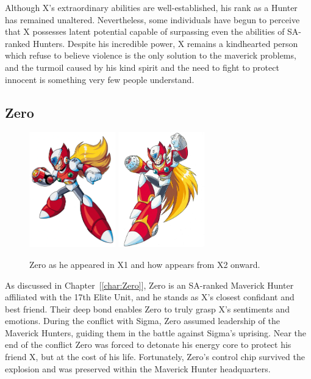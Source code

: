 Although X's extraordinary abilities are well-established, his rank as a Hunter has remained unaltered. Nevertheless, some individuals have begun to perceive that X possesses latent potential capable of surpassing even the abilities of SA-ranked Hunters. Despite his incredible power, X remains a kindhearted person which refuse to believe violence is the only solution to the maverick problems, and the turmoil caused by his kind spirit and the need to fight to protect innocent is something very few people understand\cite{Xcoll1:Manual_X2}.

\subsection{Zero}

\begin{figure}[htp]
	\centering
	\includegraphics[height=5cm]{figures/X1/Zero_X1.png}
	\includegraphics[height=5cm]{figures/X2/Hunter_stages/Zero.png}
	\caption{Zero as he appeared in X1 and how appears from X2 onward.}
\end{figure}

As discussed in Chapter~[\ref{char:Zero}], Zero is an SA-ranked Maverick Hunter affiliated with the 17th Elite Unit, and he stands as X's closest confidant and best friend. Their deep bond enables Zero to truly grasp X's sentiments and emotions. During the conflict with Sigma, Zero assumed leadership of the Maverick Hunters, guiding them in the battle against Sigma's uprising. Near the end of the conflict Zero was forced to detonate his energy core to protect his friend X, but at the cost of his life. Fortunately, Zero's control chip survived the explosion and was preserved within the Maverick Hunter headquarters.

